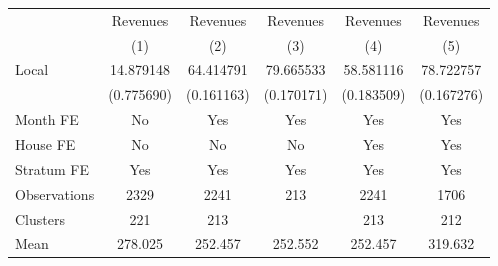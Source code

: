 {
\def\sym#1{\ifmmode^{#1}\else\(^{#1}\)\fi}
\begin{tabular}{l*{5}{c}}
\toprule
                &\multicolumn{1}{c}{Revenues}&\multicolumn{1}{c}{Revenues}&\multicolumn{1}{c}{Revenues}&\multicolumn{1}{c}{Revenues}&\multicolumn{1}{c}{Revenues}\\
                &\multicolumn{1}{c}{(1)}         &\multicolumn{1}{c}{(2)}         &\multicolumn{1}{c}{(3)}         &\multicolumn{1}{c}{(4)}         &\multicolumn{1}{c}{(5)}         \\
\midrule
Local           &14.879148         &64.414791         &79.665533         &58.581116         &78.722757         \\
                &(0.775690)         &(0.161163)         &(0.170171)         &(0.183509)         &(0.167276)         \\
Month FE        &       No         &      Yes         &      Yes         &      Yes         &      Yes         \\
House FE        &       No         &       No         &       No         &      Yes         &      Yes         \\
Stratum FE      &      Yes         &      Yes         &      Yes         &      Yes         &      Yes         \\
\midrule
Observations    &     2329         &     2241         &      213         &     2241         &     1706         \\
Clusters        &      221         &      213         &                  &      213         &      212         \\
Mean            &  278.025         &  252.457         &  252.552         &  252.457         &  319.632         \\
\bottomrule
\end{tabular}
}
